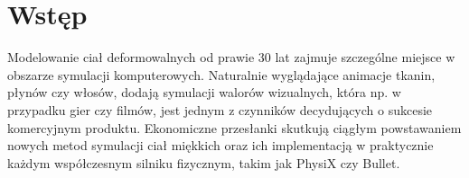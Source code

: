 \chapter{Wstęp} %

Modelowanie ciał deformowalnych od prawie 30 lat zajmuje szczególne miejsce 
w obszarze symulacji komputerowych. Naturalnie wyglądające animacje tkanin, 
płynów czy włosów, dodają symulacji walorów wizualnych, 
która np. w przypadku gier czy filmów, jest jednym z czynników decydujących o sukcesie 
komercyjnym produktu. Ekonomiczne przesłanki skutkują ciągłym powstawaniem 
nowych metod symulacji ciał miękkich oraz ich implementacją w praktycznie każdym
współczesnym silniku fizycznym, takim jak PhysiX czy Bullet.

